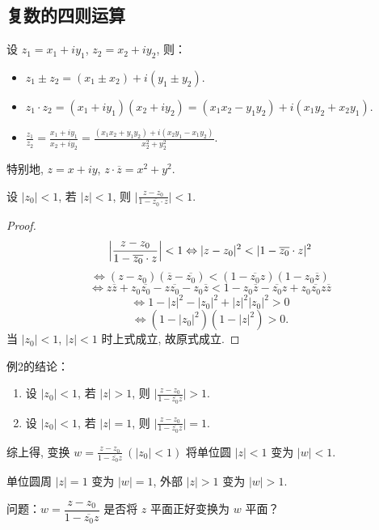 \documentclass[theorem=false,mathfont=none,openany,sub3section]{easybook}
\begin{document}
\subsection{复数的四则运算}

设 $z_{1}=x_{1}+iy_{1}$, $z_{2}=x_{2}+iy_{2}$, 则：
\begin{itemize}
  \item $z_{1}\pm z_{2}=(x_{1}\pm x_{2})+i(y_{1}\pm y_{2})$.
  \item $z_{1}\cdot z_{2}=(x_{1}+iy_{1})(x_{2}+iy_{2})=(x_{1}x_{2}-y_{1}y_{2})+i(x_{1}y_{2}+x_{2}y_{1})$.
  \item $\displaystyle\frac{z_{1}}{z_{2}}=\frac{x_{1}+iy_{1}}{x_{2}+iy_{2}}=\frac{(x_{1}x_{2}+y_{1}y_{2})+i(x_{2}y_{1}-x_{1}y_{2})}{x_{2}^{2}+y_{2}^{2}}$.
\end{itemize}

特别地, $z=x+iy$, $z\cdot\overline{z}=x^{2}+y^{2}$.

\begin{example}
  设 $|z_{0}|<1$, 若 $|z|<1$, 则 $\bigl|\frac{z-z_{0}}{1-\overline{z_{0}}\cdot z}\bigr|<1$.\par
  \begin{proof}
    \[
    \Bigl|\frac{z-z_{0}}{1-\overline{z_{0}}\cdot z}\Bigr|<1
    \Leftrightarrow |z-z_{0}|^{2}<|1-\overline{z_{0}}\cdot z|^{2}
    \]
    \[
    \Leftrightarrow (z-z_{0})(\overline{z}-\overline{z_{0}})<(1-\overline{z_{0}}z)(1-z_{0}\overline{z})
    \]
    \[
    \Leftrightarrow z\overline{z}+z_{0}\overline{z_{0}}-z\overline{z_{0}}-z_{0}\overline{z}
    <1-z_{0}\overline{z}-\overline{z_{0}}z+z_{0}\overline{z_{0}}z\overline{z}
    \]
    \[
    \Leftrightarrow 1-|z|^{2}-|z_{0}|^{2}+|z|^{2}|z_{0}|^{2}>0
    \]
    \[
    \Leftrightarrow (1-|z_{0}|^{2})(1-|z|^{2})>0.
    \]
    当 $|z_{0}|<1$, $|z|<1$ 时上式成立, 故原式成立.
  \end{proof}
\end{example}

\begin{remark}
  例2的结论：
  \begin{enumerate}
    \item 设 $|z_{0}|<1$, 若 $|z|>1$, 则 $\bigl|\frac{z-z_{0}}{1-\overline{z_{0}}z}\bigr|>1$.
    \item 设 $|z_{0}|<1$, 若 $|z|=1$, 则 $\bigl|\frac{z-z_{0}}{1-\overline{z_{0}}z}\bigr|=1$.
  \end{enumerate}
  综上得, 变换 $w=\frac{z-z_{0}}{1-\overline{z_{0}}z}\ (|z_{0}|<1)$ 将单位圆 $|z|<1$ 变为 $|w|<1$.\par
  单位圆周 $|z|=1$ 变为 $|w|=1$, 外部 $|z|>1$ 变为 $|w|>1$.\par
  问题：$w=\dfrac{z-z_{0}}{1-\overline{z_{0}}z}$ 是否将 $z$ 平面正好变换为 $w$ 平面？
\end{remark}
\end{document}
